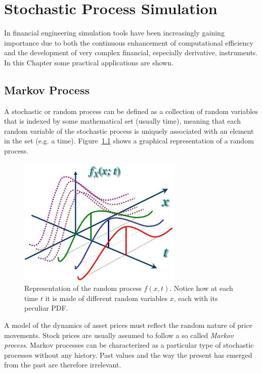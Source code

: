 \chapter{Stochastic Process Simulation}

In financial engineering simulation tools have been increasingly gaining 
importance due to both the continuous enhancement of computational efficiency 
and the development of very complex financial, especially derivative,
instruments. In this Chapter some practical applications are shown.

\section{Markov Process}

A stochastic or random process can be defined as a collection of 
random variables that is indexed by some mathematical set (usually time), 
meaning that each random variable of the stochastic process is uniquely 
associated with an element in the set (e.g. a time). Figure~\ref{fig:random_process} shows a graphical representation of a random process.

\begin{figure}[htb]
	\centering
	\includegraphics[width=0.7\textwidth]{figures/random_process}
	\caption{Representation of the random process $f(x, t)$. Notice how at each time $t$ it is made of different random variables $x$, each with its peculiar PDF.}
	\label{fig:random_process}
\end{figure}

A model of the dynamics of asset prices must reflect the random nature
of price movements. Stock prices are usually assumed to follow a so called
\emph{Markov process}. Markov processes can be characterized as a
particular type of stochastic processes without any history. Past values
and the way the present has emerged from the past are therefore
irrelevant. 

